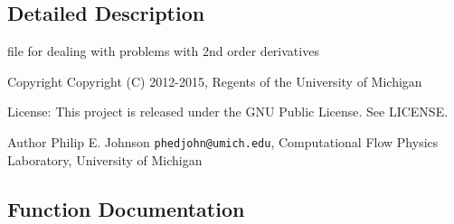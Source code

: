 \subsection{Detailed Description}
file for dealing with problems with 2nd order derivatives \begin{DoxyCopyright}{Copyright}
Copyright (C) 2012-\/2015, Regents of the University of Michigan 
\end{DoxyCopyright}
\begin{DoxyParagraph}{License\-:}
This project is released under the G\-N\-U Public License. See L\-I\-C\-E\-N\-S\-E. 
\end{DoxyParagraph}
\begin{DoxyAuthor}{Author}
Philip E. Johnson {\tt phedjohn@umich.\-edu}, Computational Flow Physics Laboratory, University of Michigan 
\end{DoxyAuthor}


\subsection{Function Documentation}
